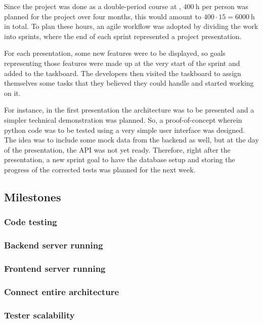 Since the project was done as a double-period course at \LTU, $\SI{400}{\hour}$ per person was planned for the project over four months, this would amount to $400\cdot15=\SI{6000}{\hour}$ in total. To plan these hours, an agile workflow was adopted by dividing the work into sprints, where the end of each sprint represented a project presentation.

For each presentation, some new features were to be displayed, so goals representing those features were made up at the very start of the sprint and added to the taskboard. The developers then visited the taskboard to assign themselves some tasks that they believed they could handle and started working on it.

For instance, in the first presentation the architecture was to be presented and a simpler technical demonstration was planned. So, a proof-of-concept wherein python code was to be tested using a very simple user interface was designed. The idea was to include some mock data from the backend as well, but at the day of the presentation, the API was not yet ready. Therefore, right after the presentation, a new sprint goal to have the database setup and storing the progress of the corrected tests was planned for the next week.

\subsection{Milestones}
%
\subsubsection{Code testing}
\subsubsection{Backend server running}
\subsubsection{Frontend server running}
\subsubsection{Connect entire architecture}
\subsubsection{Tester scalability}
